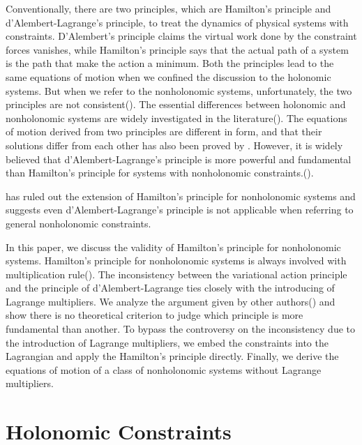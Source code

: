 \documentclass[preprint,11pt]{elsarticle}
\begin{document}
Conventionally, there are two principles, which are Hamilton's principle and d'Alembert-Lagrange's principle, to treat the dynamics of physical systems with constraints.
D'Alembert's principle claims the virtual work done by the constraint forces vanishes, while Hamilton's principle says that the actual path of a system is the path that make the action a minimum.
Both the principles lead to the same equations of motion when we confined the discussion to the holonomic systems.
But when we refer to the nonholonomic systems, unfortunately, the two principles are not consistent(\cite{cronstrom2009,flannery2005}).
The essential differences between holonomic and nonholonomic systems are widely investigated in the literature(\cite{flannery2005,pars1954,jeffreys1954,hertz1896}).
The equations of motion derived from two principles are different in form, and that their solutions differ from each other has also been proved by \cite{cronstrom2009}.
However, it is widely believed that d'Alembert-Lagrange's principle is more powerful and fundamental than Hamilton's principle for systems with nonholonomic constraints.(\cite{flannery2005,flannery2011}).


\cite{flannery2005} has ruled out the extension of Hamilton's principle for nonholonomic systems and suggests even d'Alembert-Lagrange's principle is not applicable when referring to general nonholonomic constraints.

In this paper, we discuss the validity of Hamilton's principle for nonholonomic systems.
Hamilton's principle for nonholonomic systems is always involved with multiplication rule(\cite{pars1954,jeffreys1954,hertz1896,flannery2005}).
The inconsistency between the variational action principle and the principle of d'Alembert-Lagrange ties closely with the introducing of Lagrange multipliers.
We analyze the argument given by other authors(\cite{flannery2005,cronstrom2009}) and show there is no theoretical criterion to judge which principle is more fundamental than another.
To bypass the controversy on the inconsistency due to the introduction of Lagrange multipliers, we embed the constraints into the Lagrangian and apply the Hamilton's principle directly.
Finally, we derive the equations of motion of a class of nonholonomic systems without Lagrange multipliers.

\section{Holonomic Constraints}
\end{document}
